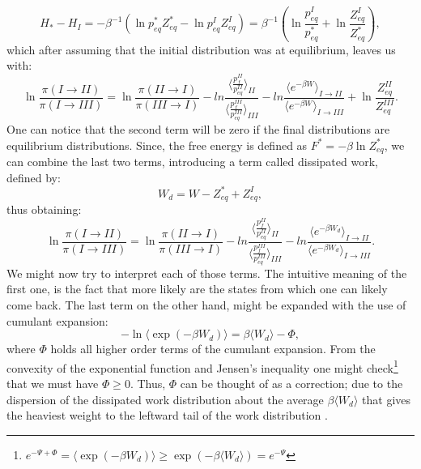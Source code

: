 \documentclass[a4paper,12pt]{article}
\begin{document}
\begin{equation}
  H_*-H_I= -\beta^{-1}( \ln{p_{eq}^* Z_{eq}^*} -  \ln{p_{eq}^I Z_{eq}^I})= \beta^{-1}( \ln{\frac{p_{eq}^I}{p_{eq}^*}} + \ln{\frac{Z_{eq}^I}{Z_{eq}^*}}),
\end{equation}
which after assuming that the initial distribution was at equilibrium, leaves us with:
\begin{equation}
  \ln \frac{\pi(I \to II)}{\pi(I \to III)} =
  \ln \frac{\pi(II \to I)}{\pi(III \to I)} - ln \frac{ \langle \frac{p_{f}^{II}}{p_{eq}^{II}}  \rangle_{II}}{ \langle \frac{p_{f}^{III}}{p_{eq}^{III}}  \rangle_{III} }
  -ln \frac{\langle e^{ - \beta W} \rangle_{I \to II}}{\langle e^{ - \beta W} \rangle_{I \to III}} + \ln{\frac{Z_{eq}^{II}}{Z_{eq}^{III} }}.
\end{equation}
One can notice that the second term will be zero if the final distributions are equilibrium distributions. Since, the free energy is defined as $F^* = -\beta \ln Z_{eq}^*$, we can combine the last two terms, introducing a term called dissipated work, defined by:
\begin{equation}
  W_d =W - Z_{eq}^* + Z_{eq}^I,
\end{equation}
thus obtaining:
\begin{equation}
  \ln \frac{\pi(I \to II)}{\pi(I \to III)} =
  \ln \frac{\pi(II \to I)}{\pi(III \to I)} - ln \frac{ \langle \frac{p_{f}^{II}}{p_{eq}^{II}}  \rangle_{II}}{ \langle \frac{p_{f}^{III}}{p_{eq}^{III}}  \rangle_{III} }
  -ln \frac{\langle e^{ - \beta W_d} \rangle_{I \to II}}{\langle e^{ - \beta W_d} \rangle_{I \to III}}.
\end{equation}
We might now try to interpret each of those terms. The intuitive meaning of the first one, is the fact that more likely are the states from which one can likely come back. The last term on the other hand, might be expanded with the use of cumulant expansion:
\begin{equation}
  -\ln \langle \exp(-\beta W_d)\rangle= \beta \langle W_d \rangle - \Phi,
\end{equation}
where $\Phi$ holds all higher order terms of the cumulant expansion. From the convexity of the exponential function and Jensen's inequality one might check\footnote{$e^{-\Psi + \Phi}=\langle \exp(-\beta W_d) \rangle \geq \exp(-\beta \langle W_d \rangle)= e^{-\Psi}$} that we must have $\Phi \geq 0$. Thus, $\Phi$ can be thought of as a correction; due to the dispersion of the dissipated work distribution about the average $\beta \langle W_d \rangle $ that gives the heaviest weight to the leftward tail of the work distribution \cite{Jarzynski:2006cq}.
\end{document}
